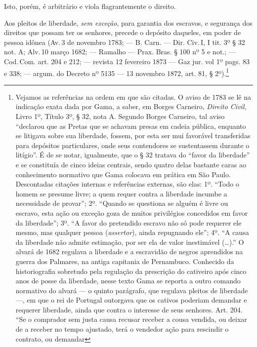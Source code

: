 {Isto, porém, é arbitrário e viola flagrantemente o direito.

Aos pleitos de liberdade, \emph{sem exceção}, para garantia dos
escravos, e segurança dos direitos que possam ter os senhores, precede o
depósito daqueles, em poder de pessoa idônea (Av.\,3 de novembro 1783; ---
B. Carn. --- Dir. Civ.\,I, I tit. 3º § 32 not. A; Alv.\,10 março 1682; ---
Ramalho --- Prax. Bras. § 100 nº 5 e not.; --- Cod.\,Com. art. 204 e 212; ---
revista 12 fevereiro 1873 --- Gaz jur. vol 1º pags. 83 e 338; ---
argum. do Decreto nº 5135 --- 13 novembro 1872, art. 81, § 2º).\footnote{
  Vejamos as referências na ordem em que são citadas. O aviso de 1783 se
  lê na indicação exata dada por Gama, a saber, em Borges Carneiro,
  \emph{Direito Civil}, Livro 1º, Título 3º, § 32, nota A. Segundo
  Borges Carneiro, tal aviso ``declarou que as Pretas que se achavam
  presas em cadeia pública, enquanto se litigava sobre sua liberdade,
  fossem, por esta ser mui favorável transferidas para depósitos
  particulares, onde seus contendores se sustentassem durante o
  litígio''. É de se notar, igualmente, que o § 32 tratava do ``favor da
  liberdade'' e se constituía de cinco ideias centrais, sendo quatro
  delas bastante caras ao conhecimento normativo que Gama colocava em
  prática em São Paulo. Descontadas citações internas e referências
  externas, são elas: 1º. ``Todo o homem se presume livre; a quem requer
  contra a liberdade incumbe a necessidade de provar''; 2º.
  ``Quando se questiona se alguém é livre ou escravo, esta ação ou
  exceção goza de muitos privilégios concedidos em favor da liberdade'';
  3º. ``A favor do pretendido escravo não só pode requerer ele mesmo, mas
  qualquer pessoa (\emph{assertor}), ainda repugnando ele''; 4º. ``A causa
  da liberdade não admite estimação, por ser ela de valor inestimável
  (\ldots{}).'' O alvará de 1682 regulava a liberdade e a escravidão de negros
  aprendidos na guerra dos Palmares, na antiga capitania de Pernambuco.
  Conhecido da historiografia sobretudo pela regulação da prescrição do
  cativeiro após cinco anos de posse da liberdade, nesse texto Gama se
  reporta a outro comando normativo do alvará --- o quinto parágrafo, que
  regulava pleitos de liberdade ---, em que o rei de Portugal outorgava que
  os cativos poderiam demandar e requerer liberdade, ainda que contra o
  interesse de seus senhores. Art. 204. ``Se o comprador sem justa causa
  recusar receber a cousa vendida, ou deixar de a receber no tempo
  ajustado, terá o vendedor ação para rescindir o contrato, ou demandar
}}
